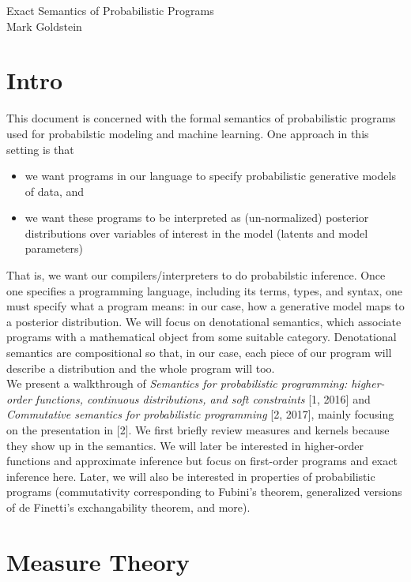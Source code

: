\documentclass[11pt]{article}
\theoremstyle{definition}
\theoremstyle{plain}
\begin{document}
\begin{center}
Exact Semantics of Probabilistic Programs\\
Mark Goldstein
\end{center}

\section{Intro}

\noindent This document is concerned with the formal semantics of probabilistic programs used
for probabilstic modeling and machine learning. One approach in this setting is that 
\begin{itemize}
    \item we want programs in our language to specify probabilistic generative models of data, and 
    \item we want these programs to be interpreted as (un-normalized) posterior distributions over
          variables of interest in the model (latents and model parameters)
\end{itemize}
\noindent That is, we want our compilers/interpreters to do probabilstic inference. 
Once one specifies a programming language, including its terms, types, and syntax, one
must specify what a program means: in our case, how a generative model maps to a posterior distribution.
We will focus on denotational semantics, which associate programs with a mathematical object from some suitable category.
Denotational semantics are compositional so that, in our case, each piece of our program
will describe a distribution and the whole program will too.\\

\noindent We present a walkthrough of \textit{Semantics for probabilistic programming: 
higher-order functions, continuous distributions, and soft constraints} [1, 2016]
and \textit{Commutative semantics for probabilistic programming} [2, 2017], 
mainly focusing on the presentation in [2]. We first briefly review measures and kernels because
they show up in the semantics. We will later be interested in higher-order functions and approximate inference 
but focus on first-order programs and exact inference here. Later, we will also be interested in properties of 
probabilistic programs (commutativity corresponding to Fubini's theorem, generalized versions of de Finetti's 
exchangability theorem, and more).

\section{Measure Theory}
\end{document}
